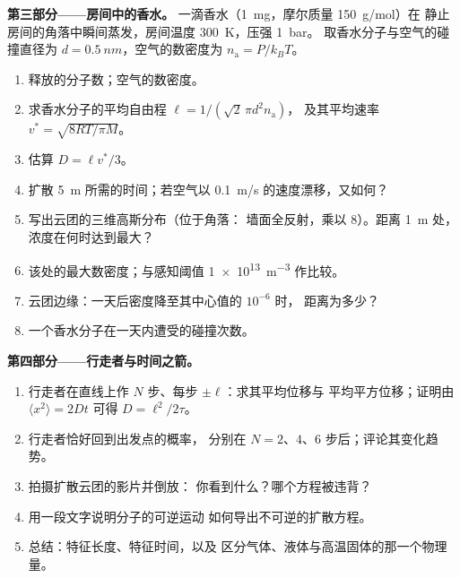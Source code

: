 \begin{problem}
\textbf{第三部分——房间中的香水。}
一滴香水（\qty{1}{mg}，摩尔质量 \qty{150}{g/mol}）在
静止房间的角落中瞬间蒸发，房间温度 \qty{300}{K}，压强 \qty{1}{bar}。
取香水分子与空气的碰撞直径为 $d =
\qty{0.5}{nm}$，空气的数密度为 $n_{\text{a}} = P/k_BT$。
\begin{enumerate}[resume]
  \item 释放的分子数；空气的数密度。
  \item 求香水分子的平均自由程 $\ell = 1/(\sqrt2\,\pi d^2 n_{\text{a}})$，
        及其平均速率 $v^* = \sqrt{8RT/\pi M}$。
  \item 估算 $D = \ell v^*/3$。
  \item 扩散 \qty{5}{m} 所需的时间；若空气以
        \qty{0.1}{m/s} 的速度漂移，又如何？
  \item 写出云团的三维高斯分布（位于角落：
        墙面全反射，乘以 $8$）。距离 \qty{1}{m} 处，
        浓度在何时达到最大？
  \item 该处的最大数密度；与感知阈值
        \qty{1e13}{m^{-3}} 作比较。
  \item 云团边缘：一天后密度降至其中心值的 $10^{-6}$ 时，
        距离为多少？
  \item 一个香水分子在一天内遭受的碰撞次数。
\end{enumerate}

\textbf{第四部分——行走者与时间之箭。}
\begin{enumerate}[resume]
  \item 行走者在直线上作 $N$ 步、每步 $\pm\ell$：求其平均位移与
        平均平方位移；证明由 $\langle x^2\rangle = 2Dt$
        可得 $D = \ell^2/2\tau$。
  \item 行走者恰好回到出发点的概率，
        分别在 $N = 2$、$4$、$6$ 步后；评论其变化趋势。
  \item 拍摄扩散云团的影片并倒放：
        你看到什么？哪个方程被违背？
  \item 用一段文字说明分子的可逆运动
        如何导出不可逆的扩散方程。
  \item 总结：特征长度、特征时间，以及
        区分气体、液体与高温固体的那一个物理量。
\end{enumerate}
\end{problem}
